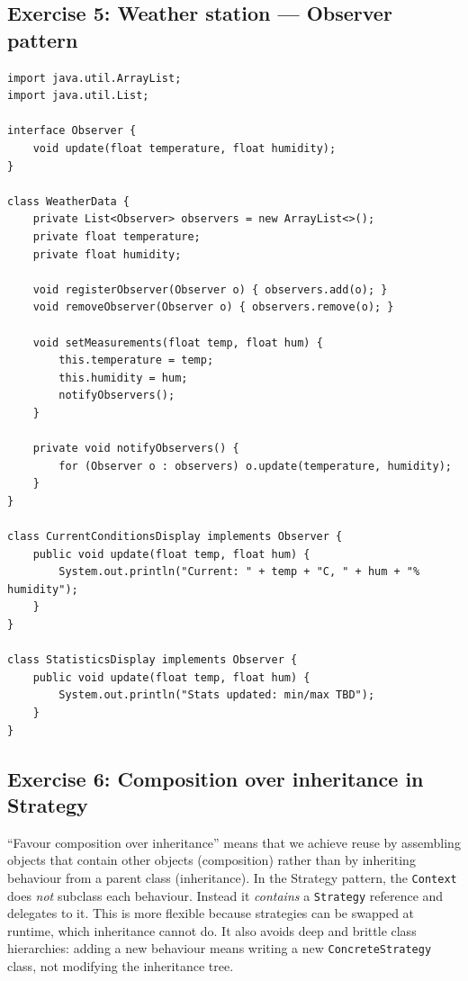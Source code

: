 \documentclass[twoside=false,DIV=14]{scrartcl}
\begin{document}
\subsection*{Exercise 5: Weather station --- Observer pattern}

\begin{lstlisting}
import java.util.ArrayList;
import java.util.List;

interface Observer {
    void update(float temperature, float humidity);
}

class WeatherData {
    private List<Observer> observers = new ArrayList<>();
    private float temperature;
    private float humidity;

    void registerObserver(Observer o) { observers.add(o); }
    void removeObserver(Observer o) { observers.remove(o); }

    void setMeasurements(float temp, float hum) {
        this.temperature = temp;
        this.humidity = hum;
        notifyObservers();
    }

    private void notifyObservers() {
        for (Observer o : observers) o.update(temperature, humidity);
    }
}

class CurrentConditionsDisplay implements Observer {
    public void update(float temp, float hum) {
        System.out.println("Current: " + temp + "C, " + hum + "% humidity");
    }
}

class StatisticsDisplay implements Observer {
    public void update(float temp, float hum) {
        System.out.println("Stats updated: min/max TBD");
    }
}
\end{lstlisting}

\subsection*{Exercise 6: Composition over inheritance in Strategy}

``Favour composition over inheritance'' means that we achieve reuse by assembling objects that contain other objects (composition) rather than by inheriting behaviour from a parent class (inheritance).  In the Strategy pattern, the \texttt{Context} does \emph{not} subclass each behaviour.  Instead it \emph{contains} a \texttt{Strategy} reference and delegates to it.  This is more flexible because strategies can be swapped at runtime, which inheritance cannot do.  It also avoids deep and brittle class hierarchies: adding a new behaviour means writing a new \texttt{ConcreteStrategy} class, not modifying the inheritance tree.
\end{document}

